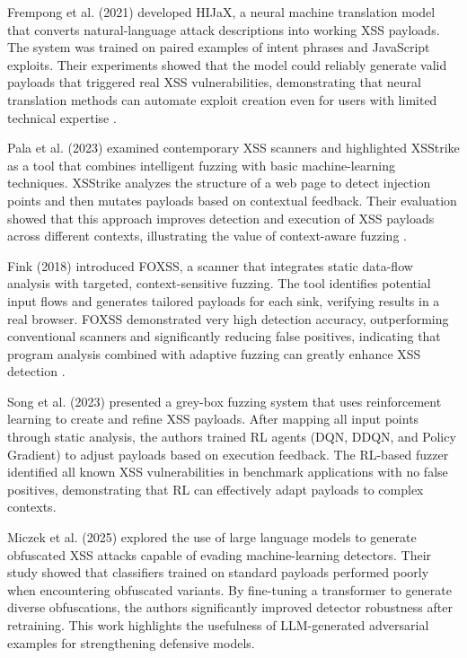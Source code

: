 Frempong et al. (2021) developed HIJaX, a neural machine translation model that converts natural-language attack descriptions into working XSS payloads. The system was trained on paired examples of intent phrases and JavaScript exploits. Their experiments showed that the model could reliably generate valid payloads that triggered real XSS vulnerabilities, demonstrating that neural translation methods can automate exploit creation even for users with limited technical expertise \cite{frempong2021hijax}.

Pala et al. (2023) examined contemporary XSS scanners and highlighted XSStrike as a tool that combines intelligent fuzzing with basic machine-learning techniques. XSStrike analyzes the structure of a web page to detect injection points and then mutates payloads based on contextual feedback. Their evaluation showed that this approach improves detection and execution of XSS payloads across different contexts, illustrating the value of context-aware fuzzing \cite{pala2023xssassessment}.

Fink (2018) introduced FOXSS, a scanner that integrates static data-flow analysis with targeted, context-sensitive fuzzing. The tool identifies potential input flows and generates tailored payloads for each sink, verifying results in a real browser. FOXSS demonstrated very high detection accuracy, outperforming conventional scanners and significantly reducing false positives, indicating that program analysis combined with adaptive fuzzing can greatly enhance XSS detection \cite{fink2018foxss}.

Song et al. (2023) presented a grey-box fuzzing system that uses reinforcement learning to create and refine XSS payloads. After mapping all input points through static analysis, the authors trained RL agents (DQN, DDQN, and Policy Gradient) to adjust payloads based on execution feedback. The RL-based fuzzer identified all known XSS vulnerabilities in benchmark applications with no false positives, demonstrating that RL can effectively adapt payloads to complex contexts\cite{song2023greybox}.

Miczek et al. (2025) explored the use of large language models to generate obfuscated XSS attacks capable of evading machine-learning detectors. Their study showed that classifiers trained on standard payloads performed poorly when encountering obfuscated variants. By fine-tuning a transformer to generate diverse obfuscations, the authors significantly improved detector robustness after retraining. This work highlights the usefulness of LLM-generated adversarial examples for strengthening defensive models\cite{miczek2025llml_xss}.